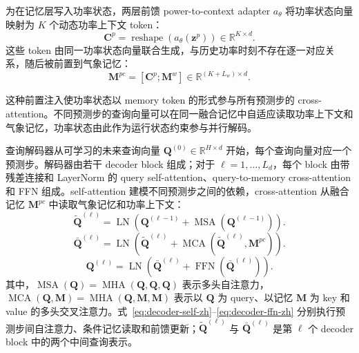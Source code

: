 为在记忆层写入功率状态，两层前馈 power-to-context adapter \(a_{\theta}\) 将功率状态向量映射为 \(K\) 个动态功率上下文 token：
\begin{equation}
\mathbf{C}^{p}=\operatorname{reshape}(a_{\theta}(\mathbf{z}^{p}))\in\mathbb{R}^{K\times d}.
\end{equation}
这些 token 由同一功率状态向量联合生成，与历史功率时刻不存在逐一对应关系，随后被前置到气象记忆：
\begin{equation}
\mathbf{M}^{pc}=[\mathbf{C}^{p};\mathbf{M}^{w}]\in\mathbb{R}^{(K+L_w)\times d}.
\end{equation}

这种前置注入使功率状态以 memory token 的形式参与所有预测步的 cross-attention。不同预测步的查询向量可以在同一融合记忆中自适应读取功率上下文和气象记忆，功率状态由此作为运行状态约束参与并行解码。

查询解码器从可学习的未来查询向量 \(\mathbf{Q}^{(0)}\in\mathbb{R}^{H\times d}\) 开始，每个查询向量对应一个预测步。解码器由若干 decoder block 组成；对于 \(\ell=1,\ldots,L_d\)，每个 block 由带残差连接和 LayerNorm 的 query self-attention、query-to-memory cross-attention 和 FFN 组成。self-attention 建模不同预测步之间的依赖，cross-attention 从融合记忆 \(\mathbf{M}^{pc}\) 中读取气象记忆和功率上下文：
\begin{equation}
\label{eq:decoder-self-zh}
\tilde{\mathbf{Q}}^{(\ell)}=\operatorname{LN}\!\left(
\mathbf{Q}^{(\ell-1)}+\operatorname{MSA}(\mathbf{Q}^{(\ell-1)})\right).
\end{equation}
\begin{equation}
\label{eq:decoder-cross-zh}
\bar{\mathbf{Q}}^{(\ell)}=\operatorname{LN}\!\left(
\tilde{\mathbf{Q}}^{(\ell)}+\operatorname{MCA}(\tilde{\mathbf{Q}}^{(\ell)},\mathbf{M}^{pc})\right).
\end{equation}
\begin{equation}
\label{eq:decoder-ffn-zh}
\mathbf{Q}^{(\ell)}=\operatorname{LN}\!\left(\bar{\mathbf{Q}}^{(\ell)}
+\operatorname{FFN}(\bar{\mathbf{Q}}^{(\ell)})\right).
\end{equation}
其中，\(\operatorname{MSA}(\mathbf{Q})=\operatorname{MHA}(\mathbf{Q},\mathbf{Q},\mathbf{Q})\) 表示多头自注意力，\(\operatorname{MCA}(\mathbf{Q},\mathbf{M})=\operatorname{MHA}(\mathbf{Q},\mathbf{M},\mathbf{M})\) 表示以 \(\mathbf{Q}\) 为 query、以记忆 \(\mathbf{M}\) 为 key 和 value 的多头交叉注意力。式~\eqref{eq:decoder-self-zh}--\eqref{eq:decoder-ffn-zh} 分别执行预测步间自注意力、条件记忆读取和前馈更新；\(\tilde{\mathbf{Q}}^{(\ell)}\) 与 \(\bar{\mathbf{Q}}^{(\ell)}\) 是第 \(\ell\) 个 decoder block 中的两个中间查询表示。


